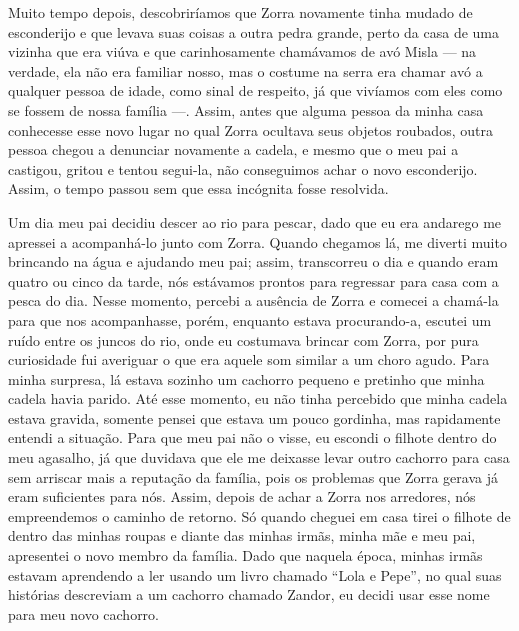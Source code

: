 Muito tempo depois, descobriríamos que Zorra novamente tinha mudado de esconderijo e que levava suas coisas a outra pedra grande, perto da casa de uma vizinha que era viúva e que carinhosamente chamávamos de avó Misla --- na verdade, ela não era familiar nosso, mas o costume na serra era chamar avó a qualquer pessoa de idade, como sinal de respeito, já que vivíamos com eles como se fossem de nossa família ---.
Assim, antes que alguma pessoa da minha casa conhecesse esse novo lugar no qual Zorra ocultava seus objetos roubados, outra pessoa chegou a denunciar novamente a cadela, e mesmo que o meu pai a castigou, gritou e tentou segui-la, não conseguimos achar o novo esconderijo. Assim, o tempo passou sem que essa incógnita fosse resolvida. 

Um dia meu pai decidiu descer ao rio para pescar, dado que eu era andarego me apressei a acompanhá-lo junto com Zorra. 
Quando chegamos lá, me diverti muito brincando na água e ajudando meu pai; assim, transcorreu o dia e quando eram quatro ou cinco da tarde, nós estávamos prontos para regressar para casa com a pesca do dia.
Nesse momento, percebi a ausência de Zorra e comecei a chamá-la para que nos acompanhasse,
porém, enquanto estava procurando-a, escutei um ruído entre os juncos do rio, onde eu costumava brincar com Zorra, por pura curiosidade fui averiguar o que era aquele som similar a um choro agudo. Para minha surpresa, lá estava sozinho um cachorro pequeno e pretinho que minha cadela havia parido.  
Até esse momento, eu não tinha percebido que minha cadela estava gravida, somente pensei que estava um pouco gordinha,
mas rapidamente entendi a situação.
Para que meu pai não o visse, eu escondi o filhote dentro do meu agasalho, já que duvidava que ele me deixasse levar outro cachorro para casa sem arriscar mais a reputação da família, pois os problemas que Zorra gerava já eram suficientes para nós.
Assim, depois de achar a Zorra nos arredores, nós empreendemos o caminho de retorno.
Só quando cheguei em casa tirei o filhote de dentro das minhas roupas e diante das minhas irmãs, minha mãe e meu pai, apresentei o novo membro da família. Dado que naquela época, minhas irmãs estavam aprendendo a ler usando um livro chamado ``Lola e Pepe'', no qual suas histórias descreviam a um cachorro chamado Zandor, eu decidi usar esse nome para meu novo cachorro. 

